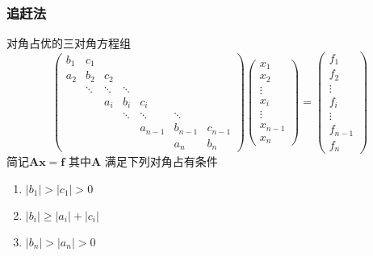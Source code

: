 \documentclass[a4paper]{article}
\begin{document}
\subsubsection{追赶法}
对角占优的三对角方程组
\[
	\begin{pmatrix} 
	b_1 & c_1 & & & & & \\
	a_2 & b_2 & c_2 & & & & \\
	    & \ddots & \ddots & \ddots & & & \\
	    & & a_i & b_i & c_i & & \\
	    & & & \ddots & \ddots & \ddots & \\
	    & & & & a_{n-1} & b_{n-1} & c_{n-1} \\
	    & & & & & a_n & b_n 
	\end{pmatrix} 
	\begin{pmatrix} x_1 \\ x_2 \\ \vdots \\ x_{i} \\ \vdots \\ x_{n-1} \\ x_{n} \end{pmatrix} 
	= \begin{pmatrix} f_1 \\ f_2 \\ \vdots \\ f_i \\ \vdots \\ f_{n-1} \\ f_n \end{pmatrix} 
\] 
简记$\mathbf{Ax} = \mathbf{f}$ 
其中$\mathbf{A}$ 满足下列对角占有条件
\begin{enumerate}
	\item $| b_1 | > | c_1 | > 0$
	\item $| b_i | \ge |a_i| + |c_i|$
	\item $|b_n| > | a_n | > 0$
\end{enumerate}
\end{document}
